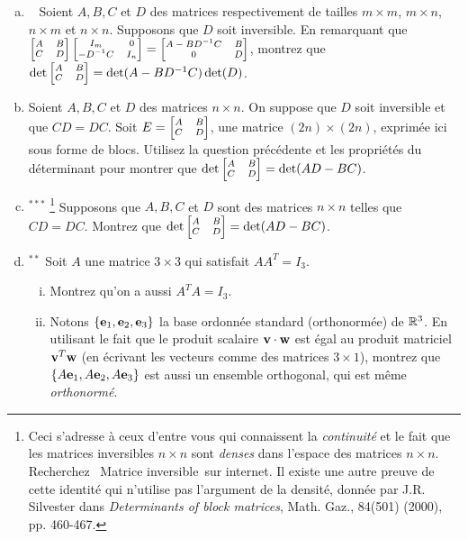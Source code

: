\begin{prob}
\begin{enumerate}[a)]
\item\sov~ Soient $A, B, C$ et $D$ des matrices respectivement de tailles $m\times m$,   $m \times n$, $n \times m$ et $n \times n$. Supposons que $D$ soit inversible. En remarquant que $ \scriptsize\bmatrix A&B\\C&D\endbmatrix \bmatrix I_m&0\\-D^{-1}C&I_n\endbmatrix  =\bmatrix A-BD^{-1}C&B\\0&D\endbmatrix$, montrez que $\det \scriptsize\bmatrix A&B\\C&D\endbmatrix= \det (A-BD^{-1}C) \det(D)$.
\medskip
 
\item Soient $A, B, C$ et $D$ des matrices $n\times n$. On suppose que $D$ soit inversible et que $CD=DC$. Soit $E=\scriptsize\bmatrix A&B\\C&D\endbmatrix$,  une matrice $(2n)\times (2n)$, exprimée ici sous forme de blocs. Utilisez la question pr\'ec\'edente et les propriétés du déterminant pour montrer que $\det \scriptsize\bmatrix A&B\\C&D\endbmatrix= \det (AD-BC)$.  \medskip

\item$^{\ast\ast\ast}$ \footnote{Ceci s'adresse à ceux d'entre vous qui connaissent la {\it continuité} et le fait que les matrices inversibles $n\times n$ sont {\it denses} dans l'espace des matrices $n\times n$. Recherchez \og\ Matrice inversible\ \fg sur internet. Il existe une autre preuve de cette identité qui n'utilise pas l'argument de la densité, donnée par J.R. Silvester dans {\it Determinants of block matrices}, Math. Gaz., 84(501) (2000), pp. 460-467.} Supposons que $A, B, C$ et $D$ sont des matrices $n\times n$ telles que $CD=DC$. Montrez que $\det \scriptsize\bmatrix A&B\\C&D\endbmatrix= \det (AD-BC)$.  \medskip

\item$^{\ast\ast}$ Soit $A$ une matrice $3 \times 3$ qui satisfait $AA^T=I_3$. \medskip

\begin{enumerate}[i)]
\item Montrez qu'on a aussi $A^TA=I_3$.
\medskip

\item Notons $\{\mathbf{e}_1, \mathbf{e}_2, \mathbf{e}_3\}$ la base ordonnée standard (orthonorm\'ee) de $\mathbb{R}^3$. En utilisant le fait que le produit scalaire $\mathbf{v}\cdot \mathbf{w}$ est égal au produit matriciel $\mathbf{v}^T \mathbf{w}$ (en écrivant les vecteurs comme des matrices $3 \times 1 $), montrez que $\{A\mathbf{e}_1, A\mathbf{e}_2, A\mathbf{e}_3\}$ est aussi un ensemble orthogonal, qui est même {\it orthonorm\'e}.
\medskip


\end{enumerate}
\end{enumerate}
\end{prob}
